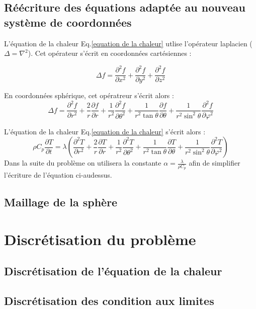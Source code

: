 \documentclass[fleqn]{article}
\begin{document}
\subsection{Réécriture des équations adaptée au nouveau système de coordonnées}
 
L'équation de la chaleur Eq.\eqref{equation de la chaleur} utlise l'opérateur laplacien ($\Delta = \nabla^2$). Cet opérateur s'écrit en coordonnées cartésiennes :

\begin{equation}
    \Delta f = {\frac {\partial ^{2}f }{\partial x^{2}}}+{\frac {\partial ^{2}f }{\partial y^{2}}}+{\frac {\partial ^{2}f }{\partial z^{2}}}
\end{equation}

En coordonnées sphérique, cet opératreur s'écrit alors :
\begin{equation}
     \Delta f={\frac {\partial ^{2}f}{\partial r^{2}}}+{\frac {2}{r}}{\frac {\partial f}{\partial r}}+{\frac {1}{r^{2}}}{\frac {\partial ^{2}f}{\partial \theta ^{2}}}+{\frac {1}{r^{2}\tan \theta }}{\frac {\partial f}{\partial \theta }}+{\frac {1}{r^{2}\sin ^{2}\theta }}{\frac {\partial ^{2}f}{\partial \varphi ^{2}}}
\end{equation}

L'équation de la chaleur Eq.\eqref{equation de la chaleur} s'écrit alors :
\begin{equation}
    \rho C_p \frac{ \partial T}{\partial t}  = \lambda \left( 
    {\frac {\partial ^{2}T}{\partial r^{2}}}+{\frac {2}{r}}{\frac {\partial T}{\partial r}}+{\frac {1}{r^{2}}}{\frac {\partial ^{2}T}{\partial \theta ^{2}}}+{\frac {1}{r^{2}\tan \theta }}{\frac {\partial T}{\partial \theta }}+{\frac {1}{r^{2}\sin ^{2}\theta }}{\frac {\partial ^{2}T}{\partial \varphi ^{2}}} \right)      
\end{equation}
Dans la suite du problème on utilisera la constante $\alpha = \frac{\lambda}{\rho C_p}$ afin de simplifier l'écriture de l'équation ci-audessus.

\subsection{Maillage de la sphère}

\section{Discrétisation du problème} 
\subsection{Discrétisation de l'équation de la chaleur}
\subsection{Discrétisation des condition aux limites}


 
\end{document}
